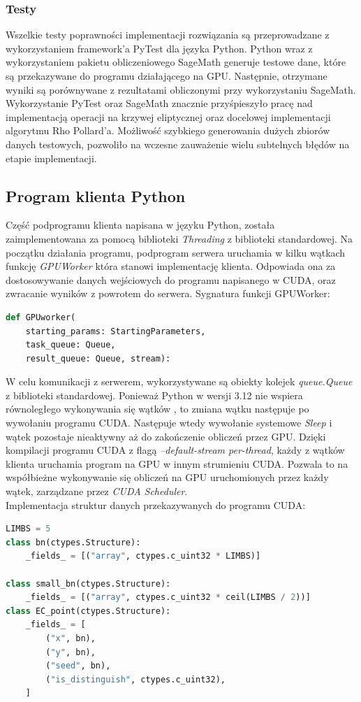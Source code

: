 \subsubsection{Testy}
Wszelkie testy poprawności implementacji rozwiązania są przeprowadzane z wykorzystaniem framework'a PyTest dla języka Python.
Python wraz z wykorzystaniem pakietu obliczeniowego SageMath generuje testowe dane, które
są przekazywane do programu działającego na GPU. Następnie, otrzymane wyniki są porównywane z rezultatami
obliczonymi przy wykorzystaniu SageMath. Wykorzystanie PyTest oraz SageMath znacznie przyśpieszyło pracę
nad implementacją operacji na krzywej eliptycznej oraz docelowej implementacji algorytmu Rho Pollard'a.
Możliwość szybkiego generowania dużych zbiorów danych testowych, pozwoliło na wczesne zauważenie wielu subtelnych błędów
na etapie implementacji.


\subsection{Program klienta Python}
Część podprogramu klienta napisana w języku Python, została zaimplementowana
za pomocą biblioteki \textit{Threading} z biblioteki standardowej.
Na początku działania programu, podprogram serwera uruchamia w kilku wątkach
funkcję \textit{GPUWorker} która stanowi implementację klienta.
Odpowiada ona za
dostosowywanie danych wejściowych do programu napisanego w CUDA, oraz
zwracanie wyników z powrotem do serwera. Sygnatura funkcji GPUWorker:
\begin{lstlisting}[language=Python]
def GPUworker(
    starting_params: StartingParameters,
    task_queue: Queue,
    result_queue: Queue, stream):
\end{lstlisting}

W celu komunikacji z serwerem, wykorzystywane są obiekty kolejek
\textit{queue.Queue} z biblioteki standardowej.
Ponieważ Python w wersji 3.12 nie wspiera równoległego wykonywania
się wątków \cite{GIL}, to zmiana wątku następuje po wywołaniu programu CUDA.
Następuje wtedy wywołanie systemowe \textit{Sleep} i wątek pozostaje nieaktywny
aż do zakończenie obliczeń przez GPU.
Dzięki kompilacji programu CUDA z flagą \textit{--default-stream per-thread},
każdy z wątków klienta uruchamia program na GPU w innym strumieniu CUDA. Pozwala
to na współbieżne wykonywanie się obliczeń na GPU uruchomionych przez każdy wątek, zarządzane przez
\textit{CUDA Scheduler}. \\
Implementacja struktur danych przekazywanych do programu CUDA:
\begin{lstlisting}[language=Python]
LIMBS = 5
class bn(ctypes.Structure):
    _fields_ = [("array", ctypes.c_uint32 * LIMBS)]

class small_bn(ctypes.Structure):
    _fields_ = [("array", ctypes.c_uint32 * ceil(LIMBS / 2))]
class EC_point(ctypes.Structure):
    _fields_ = [
        ("x", bn),
        ("y", bn),
        ("seed", bn),
        ("is_distinguish", ctypes.c_uint32),
    ]
\end{lstlisting}

